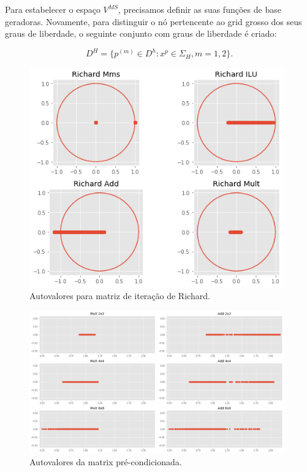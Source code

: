 Para estabelecer o espaço $V^{MS}$, precisamos definir as suas funções de base geradoras.
Novamente, para distinguir o nó pertencente ao grid grosso dos seus graus de liberdade, o seguinte conjunto com graus de liberdade é criado:


\begin{equation}\label{eq:dheq}
    D^H = \{ p^{(m)} \in D^h : x^p \in \Sigma_H, m=1,2\}.
\end{equation}



\begin{figure}[!htbp]
\centering
\includegraphics[width=11cm]{chap06/figs/IteracaoRichard.png}
\caption{Autovalores para matriz de iteração de Richard.}
\label{fig:nnzGrafico}
\end{figure}

\begin{figure}[!htbp]
\centering
\includegraphics[width=11cm]{chap06/figs/AutovaloresMatPrecondicionada.png}
\caption{Autovalores da matrix pré-condicionada.}
\label{fig:nnzGrafico}
\end{figure}





